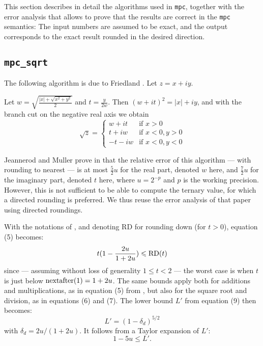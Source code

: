 \documentclass [11pt]{article}
\newcommand {\mpc}{{\tt mpc}}
\renewcommand {\leq}{\leqslant}
\begin{document}
This section describes in detail the algorithms used in \mpc, together with
the error analysis that allows to prove that the results are correct in the
{\mpc} semantics: The input numbers are assumed to be exact, and the output
corresponds to the exact result rounded in the desired direction.


\subsection {\texttt {mpc\_sqrt}}

The following algorithm is due to Friedland \cite{Friedland67,Smith98}.
Let $z = x + i y$.

Let $w = \sqrt { \frac {|x| + \sqrt {x^2 + y^2}}{2}}$ and
$t = \frac {y}{2w}$. Then $(w + it)^2 = |x| + iy$, and with the branch cut on the negative real axis we obtain
\[
\sqrt z = \left\{
\begin {array}{cl}
w + i t & \text {if } x > 0 \\
t + i w & \text {if } x < 0, y > 0 \\
-t - i w & \text {if } x < 0, y < 0
\end {array}
\right.
\]

Jeannerod and Muller prove in \cite{jeannerod:ensl-01780265} that the relative
error of this algorithm --- with rounding to nearest ---
is at most $\frac{5}{2} u$ for the real part, denoted
$w$ here, and
$\frac{7}{2} u$ for the imaginary part, denoted $t$ here,
where $u = 2^{-p}$ and $p$ is the
working precision.
However, this is not sufficient to be able to compute the ternary value,
for which a directed rounding is preferred.
We thus reuse the error analysis of that paper using directed roundings.

With the notations of \cite{jeannerod:ensl-01780265}, and denoting RD for
rounding down (for $t > 0$), equation (5) becomes:
\[ t (1 - \frac{2u}{1+2u}) \leq {\rm RD}(t) \]
since --- assuming without loss of generality $1 \leq t < 2$ ---
the worst case is when $t$ is just below ${\rm nextafter}(1) = 1+2u$.
The same bounds apply both for additions and multiplications, as in equation (5)
from \cite{jeannerod:ensl-01780265}, but also for the square root and division,
as in equations (6) and (7).
The lower bound $L'$ from equation (9) then becomes:
\[ L' = (1 - \delta_d)^{5/2} \] %
with $\delta_d = 2u/(1+2u)$. %
It follows from a Taylor expansion of $L'$:
\[ 1 - 5u \leq L'. \]
\end{document}
